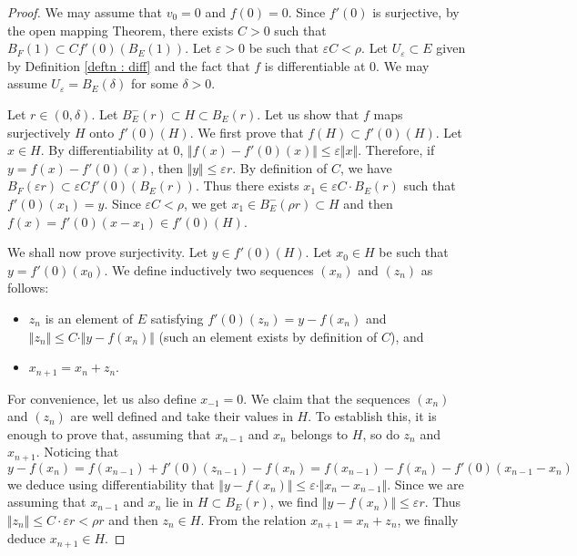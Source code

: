 \documentclass{lms}
\begin{document}
\begin{proof}
We may assume that $v_0=0$ and $f(0)=0$. Since $f'(0)$ is surjective, by 
the open mapping Theorem, there exists $C>0$ such that $B_F(1) \subset 
C  f'(0)(B_E(1))$. Let $\varepsilon>0$ be such that 
$\varepsilon C < \rho$. Let $U_\varepsilon \subset E$ given by Definition 
\ref{deftn : diff} and the fact that $f$ is differentiable at $0$. We 
may assume $U_\varepsilon = B_E(\delta)$ for some $\delta >0$.

Let $r \in (0, \delta)$. Let $B^-_E(r) \subset H \subset B_E(r).$ Let us 
show that $f$ maps surjectively $H$ onto $f'(0) (H)$. We first prove 
that $f(H) \subset f'(0) (H)$. Let $x \in H$. By differentiability at 
$0$, $\Vert f(x)-f'(0)(x) \Vert \leq \varepsilon \Vert x \Vert $. 
Therefore, if $y=f(x)-f'(0)(x)$, then $\Vert y \Vert \leq 
\varepsilon r$. By definition of $C$, we have $B_F(\varepsilon r) 
\subset \varepsilon C f'(0) (B_E(r))$. Thus there exists $x_1 \in 
\varepsilon C \cdot B_E(r)$ such that $f'(0) (x_1) =y$. Since 
$\varepsilon C < \rho$, we get $x_1 \in B^-_E(\rho r) \subset H$ and 
then $f(x)= f'(0) (x-x_1) \in f'(0) (H)$.

We shall now prove surjectivity. Let $y \in f'(0) (H)$. Let $x_0 \in H$ 
be such that $y = f'(0) (x_0)$. We define inductively two sequences 
$(x_n)$ and $(z_n)$ as follows:
\begin{itemize}
\item $z_n$ is an element of $E$ satisfying $f'(0)(z_n) = y - 
f(x_n)$ and $\Vert z_n \Vert \leq C \cdot \Vert y - f(x_n) \Vert$ (such 
an element exists by definition of $C$), and
\item $x_{n+1}=x_n+z_n$.
\end{itemize}
For convenience, let us also define $x_{-1} = 0$. We claim that the 
sequences $(x_n)$ and $(z_n)$ are well defined and take their values in 
$H$. To establish this, it is enough to prove that, assuming that 
$x_{n-1}$ and $x_n$ belongs to $H$, so do $z_n$ and $x_{n+1}$. Noticing
that 
\begin{equation}
\label{eq:mainlemma}
y - f(x_n) 
= f(x_{n-1}) + f'(0)(z_{n-1}) - f(x_n)
= f(x_{n-1}) - f(x_n) - f'(0)(x_{n-1} - x_n)
\end{equation}
we deduce using differentiability that
$\Vert y - f(x_n) \Vert \leq \varepsilon \cdot \Vert x_n - x_{n-1}
\Vert$.
Since we are assuming that $x_{n-1}$ and $x_n$ lie in $H \subset
B_E(r)$, we find $\Vert y - f(x_n) \Vert \leq \varepsilon r$. Thus
$\Vert z_n \Vert \leq C \cdot \varepsilon r < \rho r$ and then
$z_n \in H$. From the relation $x_{n+1} = x_n + z_n$, we finally
deduce $x_{n+1} \in H$.


\end{proof}
\end{document}
